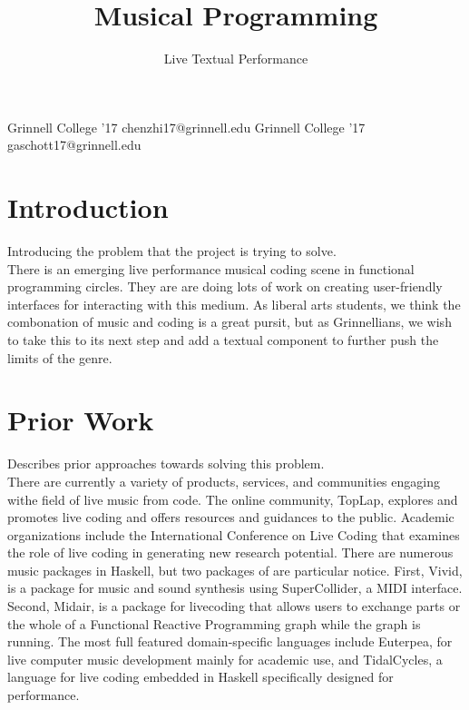 \documentclass[preprint]{sigplanconf}
\begin{document}
\setlength{\pdfpageheight}{\paperheight}
\setlength{\pdfpagewidth}{\paperwidth}


\title{Musical Programming}
\subtitle{Live Textual Performance}

           {Grinnell College '17}
           {chenzhi17@grinnell.edu}
           {Grinnell College '17}
           {gaschott17@grinnell.edu}

\maketitle

\section{Introduction}

Introducing the problem that the project is trying to solve.\\

There is an emerging live performance musical coding scene in functional programming circles. They are are doing lots of work on creating user-friendly interfaces for interacting with this medium. As liberal arts students, we think the combonation of music and coding is a great pursit, but as Grinnellians, we wish to take this to its next step and add a textual component to further push the limits of the genre.

\section{Prior Work}

Describes prior approaches towards solving this problem.\\

There are currently a variety of products, services, and communities engaging withe field of live music from code. The online community, TopLap, explores and promotes live coding and offers resources and guidances to the public. Academic organizations include the International Conference on Live Coding that examines the role of live coding in generating new research potential. There are numerous music packages in Haskell, but two packages of are particular notice. First, Vivid, is a package for music and sound synthesis using SuperCollider, a MIDI interface. Second, Midair, is a package for livecoding that allows users to exchange parts or the whole of a Functional Reactive Programming graph while the graph is running. The most full featured domain-specific languages include Euterpea, for live computer music development mainly for academic use, and TidalCycles, a language for live coding embedded in Haskell specifically designed for performance.
\end{document}
